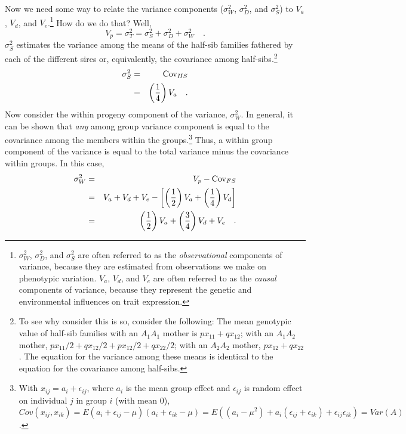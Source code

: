 \documentclass[12pt]{article}
\begin{document}
Now we need some way to relate the variance components ($\sigma^2_W$,
$\sigma^2_D$, and $\sigma^2_S$) to $V_a$, $V_d$, and
$V_e$.\footnote{$\sigma^2_W$, $\sigma^2_D$, and $\sigma^2_S$ are often
  referred to as the {\it observational\/} components of variance,
  because they are estimated from observations we make on phenotypic
  variation. $V_a$, $V_d$, and $V_e$ are often referred to as the {\it
    causal\/} components of variance, because they represent the
  genetic and environmental influences on trait
  expression.} How do we
do that?  Well,
\[
V_p = \sigma^2_T = \sigma^2_S + \sigma^2_D + \sigma^2_W \quad .
\]
$\sigma^2_S$ estimates the variance among the means of the half-sib
families fathered by each of the different sires or, equivalently, the
covariance among half-sibs.\footnote{To see why consider this is so,
  consider the following: The mean genotypic value of half-sib
  families with an $A_1A_1$ mother is $px_{11} + qx_{12}$; with an
  $A_1A_2$ mother, $px_{11}/2 + qx_{12}/2 + px_{12}/2 + qx_{22}/2$;
  with an $A_2A_2$ mother, $px_{12} + qx_{22}$.  The equation for the
  variance among these means is identical to the equation for the
  covariance among half-sibs.}
\begin{eqnarray*}
\sigma^2_S &=& \mbox{Cov}_{HS} \\
           &=& \left(\frac{1}{4}\right)V_a \quad .
\end{eqnarray*}
Now consider the within progeny component of the variance,
$\sigma^2_W$.  In general, it can be shown that {\it any\/} among
group variance component is equal to the covariance among the members
within the groups.\footnote{With $x_{ij} = a_i + \epsilon_{ij}$, where
  $a_i$ is the mean group effect and $\epsilon_{ij}$ is random effect
  on individual $j$ in group $i$ (with mean 0), $Cov(x_{ij},x_{ik}) =
  E(a_i + \epsilon_{ij} - \mu)(a_i + \epsilon_{ik} - \mu) = E((a_i
  -\mu^2) + a_i(\epsilon_{ij} + \epsilon_{ik}) +
  \epsilon_{ij}\epsilon_{ik}) = Var(A)$.}  Thus, a within group
component of the variance is equal to the total variance minus the
covariance within groups.  In this case,
\begin{eqnarray*}
\sigma^2_W &=& V_p - \mbox{Cov}_{FS} \\
 &=& V_a + V_d + V_e - \left[\left(\frac{1}{2}\right)V_a +
                            \left(\frac{1}{4}\right)V_d
                      \right] \\
 &=& \left(\frac{1}{2}\right)V_a
    + \left({3 \over 4}\right)V_d
    + V_e \quad .
\end{eqnarray*}
\end{document}
